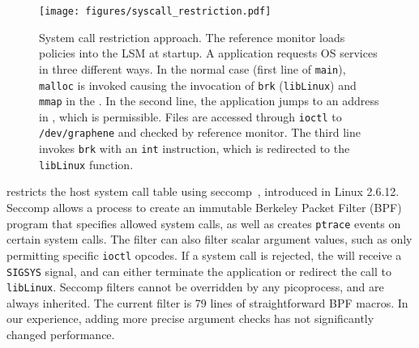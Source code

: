 


\begin{figure}[t!]
\centering
\texttt{[image: figures/syscall\_restriction.pdf]}
\footnotesize
\caption[System call restriction approach in sysname{}]
{System call restriction approach. The reference monitor loads policies into the LSM at startup.  A \sysname{} application requests OS services in three different ways. 
In the normal case (first line of {\tt main}), {\tt malloc} is invoked causing the invocation of {\tt brk} ({\tt libLinux}) and {\tt mmap} in the \pal{}. In the second line, the application jumps to an address in \pal{}, which is permissible.
Files are accessed through {\tt ioctl} to {\tt /dev/graphene} and checked by reference monitor.
The third line invokes {\tt brk} with an {\tt int} instruction, which is redirected to the {\tt libLinux} function.}
\label{fig:graphene:syscall-restriction}
\end{figure}



\sysname{} restricts the host system call table 
using seccomp~\citep{seccomp}, introduced in Linux 2.6.12.
Seccomp allows a process to create an immutable Berkeley Packet Filter (BPF) program
that specifies allowed system calls, as well as creates {\tt ptrace} 
events on certain system calls.
The filter can also filter scalar argument values,
such as only permitting specific {\tt ioctl} opcodes.
If a system call is rejected, the \pal{} will receive a {\tt SIGSYS} signal,
and can either terminate the application or redirect the 
call to {\tt libLinux}.
Seccomp filters cannot be overridden by any picoprocess,
and are always inherited.
The current \sysname{} filter is 79 lines 
of straightforward BPF macros.  In our experience, adding more precise argument checks
has not significantly changed performance.

